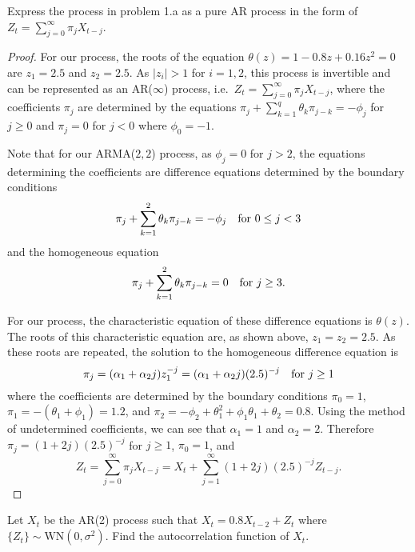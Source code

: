 \documentclass[12pt]{article}
\theoremstyle{definition}
\newenvironment{custompbm}[1]
  {\renewcommand\theproblem{#1}\problem}
  {\endproblem}
\begin{document}
\begin{custompbm}{1.d}
  Express the process in problem 1.a as a pure AR process in the form of $Z_t = \sum_{j=0}^\infty \pi_j X_{t-j}$.
\end{custompbm}

\begin{proof}
  For our process, the roots of the equation $\theta(z) = 1 -0.8 z + 0.16 z^2 = 0$ are
  $z_1 = 2.5$ and $z_2 = 2.5$. As $|z_i| > 1$ for $i=1,2$, this process is invertible and
  can be represented as an AR($\infty$) process, i.e.\ $Z_t = \sum_{j=0}^\infty \pi_j X_{t-j}$,
  where the coefficients $\pi_j$ are determined by the equations $\pi_j + \sum_{k=1}^q \theta_k \pi_{j-k} = -\phi_j$
  for $j \geq 0$ and $\pi_j = 0$ for $j < 0$ where $\phi_0 = -1$.

  Note that for our ARMA($2, 2$) process, as $\phi_j = 0$ for $j > 2$, the equations
  determining the coefficients are difference equations determined by the boundary conditions
  \[
    \pi_j + \sum_{k=1}^2 \theta_k \pi_{j-k} = -\phi_j \text{\quad \text{for $0 \leq j < 3$}}
  \]
  and the homogeneous equation
  \[
    \pi_j + \sum_{k=1}^2 \theta_k \pi_{j-k} = 0 \text{\quad \text{for $j \geq 3$}}.
  \]

  For our process, the characteristic equation of these difference equations is $\theta(z)$. The roots
  of this characteristic equation are, as shown above, $z_1 = z_2 = 2.5$. As these roots
  are repeated, the solution to the homogeneous difference equation is
  \[
    \pi_j = (\alpha_1 + \alpha_2j)z_1 ^ {-j} = (\alpha_1 + \alpha_2j)(2.5)^{-j} \text{\quad for $j \geq 1$}
  \]
  where the coefficients are determined by the boundary conditions $\pi_0 = 1$,
  $\pi_1 = -(\theta_1 + \phi_1) = 1.2$, and $\pi_2 = -\phi_2 + \theta_1^2 + \phi_1\theta_1 + \theta_2 = 0.8$.
  Using the method of undetermined coefficients, we can see that $\alpha_1 = 1$ and $\alpha_2 = 2$.
  Therefore $\pi_j = (1 + 2j)(2.5)^{-j}$ for $j \geq 1$, $\pi_0 = 1$, and
  \[
    Z_t = \sum_{j=0}^\infty\pi_j X_{t-j} = X_t + \sum_{j=1}^\infty (1+2j)(2.5)^{-j}Z_{t-j}.
  \]
\end{proof}


\begin{custompbm}{2.a}
  Let $X_t$ be the AR(2) process such that $X_t = 0.8X_{t-2} + Z_t$ where $\{Z_t\}\sim \text{WN}(0, \sigma^2)$.
  Find the autocorrelation function of $X_t$.
\end{custompbm}
\end{document}
